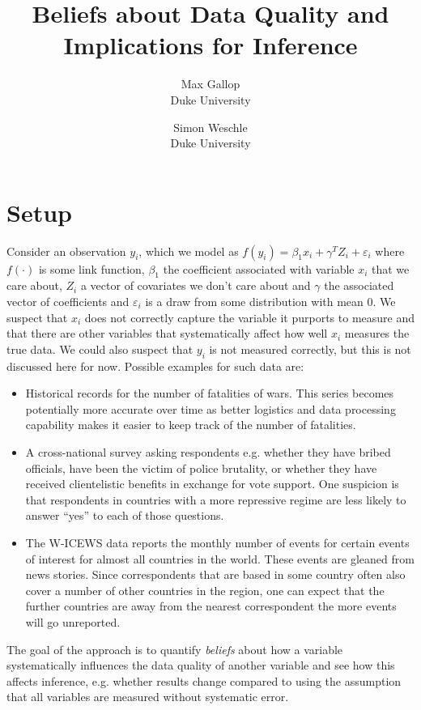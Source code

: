 \documentclass[fignum,letterpaper,12pt]{article}
\title{Beliefs about Data Quality and Implications for Inference}
\author{
Max Gallop\\
	Duke University\\
\and
Simon Weschle\\
	Duke University\\
}
\begin{document}
\maketitle
\thispagestyle{empty}


\section{Setup}
\noindent
Consider an observation $y_i$, which we model as $f(y_i)=\beta_1 x_i + \gamma^T Z_i + \varepsilon_i$ where $f(\cdot)$ is some link function, $\beta_1$ the coefficient associated with variable $x_i$ that we care about, $Z_i$ a vector of covariates we don't care about and $\gamma$ the associated vector of coefficients and $\varepsilon_i$ is a draw from some distribution with mean $0$. We suspect that $x_i$ does not correctly capture the variable it purports to measure and that there are other variables that systematically affect how well $x_i$ measures the true data. We could also suspect that $y_i$ is not measured correctly, but this is not discussed here for now. Possible examples for such data are:
\begin{itemize}
\item Historical records for the number of fatalities of wars. This series becomes potentially more accurate over time as better logistics and data processing capability makes it easier to keep track of the number of fatalities.
\item A cross-national survey asking respondents e.g. whether they have bribed officials, have been the victim of police brutality, or whether they have received clientelistic benefits in exchange for vote support. One suspicion is that respondents in countries with a more repressive regime are less likely to answer ``yes'' to each of those questions.
\item The W-ICEWS data reports the monthly number of events for certain events of interest for almost all countries in the world. These events are gleaned from news stories. Since correspondents that are based in some country often also cover a number of other countries in the region, one can expect that the further countries are away from the nearest correspondent the more events will go unreported. 
\end{itemize}
The goal of the approach is to quantify \textit{beliefs} about how a variable systematically influences the data quality of another variable and see how this affects inference, e.g. whether results change compared to using the assumption that all variables are measured without systematic error. 
\end{document}
